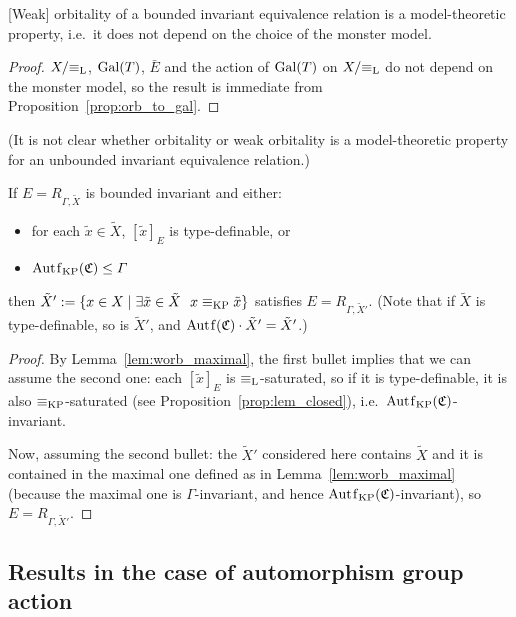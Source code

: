 	
	
	\begin{cor}
		\label{cor:mtprop}
		{}[Weak] orbitality of a bounded invariant equivalence relation is a model-theoretic property, i.e.\ it does not depend on the choice of the monster model.
	\end{cor}
	\begin{proof}
		$X/{\equiv_{\mathrm{L}}}$, $\operatorname{{Gal}}(T)$, $\bar E$ and the action of $\operatorname{{Gal}}(T)$ on $X/{\equiv_{\mathrm{L}}}$ do not depend on the monster model, so the result is immediate from Proposition~\ref{prop:orb_to_gal}.
	\end{proof}
	(It is not clear whether orbitality or weak orbitality is a model-theoretic property for an unbounded invariant equivalence relation.)
	
	
	\begin{lem}
		\label{lem:closed_cl_to_closed_witn}
		If $E=R_{\Gamma,\tilde X}$ is bounded invariant and either:
		\begin{itemize}
			\item
			for each $\tilde x\in \tilde X$, $[\tilde x]_E$ is type-definable, or
			\item
			$\Autf_\KP(\fC)\leq \Gamma$
		\end{itemize}
		then $\tilde X':=\{x\in X\mid \exists \tilde x\in \tilde X \ \ x \equiv_{\mathrm{KP}} \tilde x \}$ satisfies $E=R_{\Gamma,\tilde X'}$. (Note that if $\tilde X$ is type-definable, so is $\tilde X'$, and $\Autf(\fC)\cdot \tilde X'=\tilde X'$.)
	\end{lem}
	\begin{proof}
		By Lemma~\ref{lem:worb_maximal}, the first bullet implies that we can assume the second one: each $[\tilde x]_E$ is $\equiv_{\mathrm{L}}$-saturated, so if it is type-definable, it is also $\equiv_{\mathrm{KP}}$-saturated (see Proposition~\ref{prop:lem_closed}), i.e.\ $\Autf_\KP(\fC)$-invariant.
		
		Now, assuming the second bullet: the $\tilde X'$ considered here contains $\tilde X$ and it is contained in the maximal one defined as in Lemma~\ref{lem:worb_maximal} (because the maximal one is $\Gamma$-invariant, and hence $\Autf_\KP(\fC)$-invariant), so $E=R_{\Gamma,\tilde X'}$.
	\end{proof}
	
	
	\subsection*{Results in the case of automorphism group action}
	
	
	
